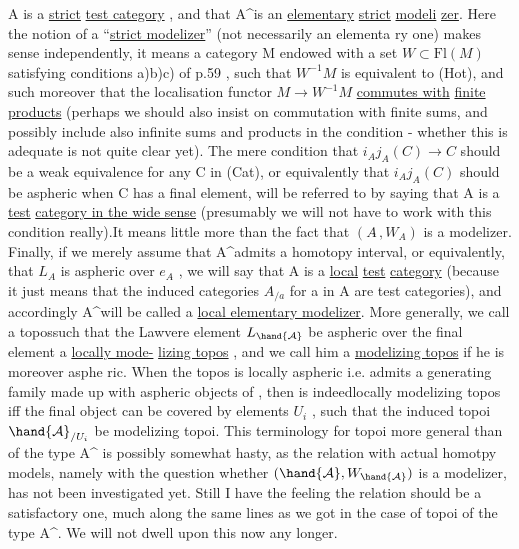 
A is a \uline{strict}  \uline{test category} ,  and that A\^{}is an \uline{elementary} \uline{strict} \uline{modeli}%
\uline{zer}.  Here the notion of a ``\uline{strict modelizer}''  (not necessarily an elementa%
ry one)  makes sense independently,  it means a category M endowed with
a set  $W\subset \mathrm{Fl}(M)$  satisfying conditions a)b)c) of p.59 ,  such that $W^{-1}M$
is equivalent to (Hot),  and such moreover that the localisation functor
$M\to W^{-1}M$ \uline{commutes with} \uline{finite  products} (perhaps we should also insist on
commutation with finite sums,  and possibly include also infinite sums and
products in the condition  -  whether this is adequate is not quite clear
yet).  The mere condition  that $i_Aj_A(C)\to C$ should be a weak equivalence
for any C in (Cat),  or equivalently that  $i_Aj_A(C)$ should be aspheric when
C has a final element,  will be referred to by saying that A is a \uline{test}
 \uline{category in the wide sense} (presumably we will not have to work with this
 condition really).It means little more than the fact that $(A\hat{}\,, W_A)$ is a
modelizer.  Finally, if we merely assume that A\^{}admits a homotopy interval,
or equivalently,  that $L_A$ is aspheric over $e_{A\hat{}}$ ,  we will say that A is
a \uline{local} \uline{test} \uline{category}  (because it just means that the induced categories
$A_{/a}$   for a in A  are test categories),  and accordingly A\^{}\hand{/}will be called
a \uline{local elementary modelizer}.  M\hand{\unsure{$\check{}$}}ore generally,  we call a topos\hand{/}such that
the Lawvere element $L_{\hand{\mathcal{A}}}$  be aspheric over the final element a \uline{locally mode-}%
\uline{lizing topos} ,  and we call him a \uline{modelizing topos} if he is moreover asphe%
ric.  When the topos is locally aspheric i.e. admits a generating family
made up with aspheric objects of ,  then  is indeed\hand{/}locally modelizing
topos iff the final object can be covered by elements $U_i$ ,  such that the
induced topoi $\hand{\mathcal{A}}_{/U_i}$  be modelizing topoi.  This terminology for topoi more
general than of the type A\^{} is possibly somewhat hasty,  as the relation
with actual homotpy models,  namely with the question whether $(\hand{\mathcal{A}},W_{\hand{\mathcal{A}}})$ is
a modelizer,  has not been investigated yet.  Still I have the feeling
the relation should be a satisfactory one,  much along the same lines as
we got in the case of topoi of the type A\^{}.  We will not dwell upon this
now any longer.

